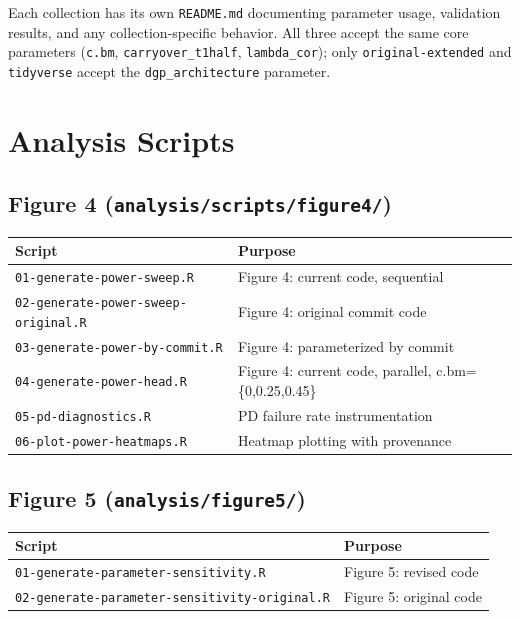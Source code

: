 \documentclass[11pt]{article}
\begin{document}
Each collection has its own \texttt{README.md} documenting
parameter usage, validation results, and any
collection-specific behavior. All three accept the same core
parameters (\texttt{c.bm}, \texttt{carryover\_t1half},
\texttt{lambda\_cor}); only \texttt{original-extended} and
\texttt{tidyverse} accept the \texttt{dgp\_architecture}
parameter.

\section{Analysis Scripts}

\subsection{Figure 4 (\texttt{analysis/scripts/figure4/})}

\begin{table}[h]
\centering
\begin{tabular}{ll}
\toprule
Script & Purpose \\
\midrule
\texttt{01-generate-power-sweep.R} & Figure 4: current code, sequential \\
\texttt{02-generate-power-sweep-original.R} & Figure 4: original commit code \\
\texttt{03-generate-power-by-commit.R} & Figure 4: parameterized by commit \\
\texttt{04-generate-power-head.R} & Figure 4: current code, parallel, c.bm=\{0,0.25,0.45\} \\
\texttt{05-pd-diagnostics.R} & PD failure rate instrumentation \\
\texttt{06-plot-power-heatmaps.R} & Heatmap plotting with provenance \\
\bottomrule
\end{tabular}
\end{table}

\subsection{Figure 5 (\texttt{analysis/figure5/})}

\begin{table}[h]
\centering
\begin{tabular}{ll}
\toprule
Script & Purpose \\
\midrule
\texttt{01-generate-parameter-sensitivity.R} & Figure 5: revised code \\
\texttt{02-generate-parameter-sensitivity-original.R} & Figure 5: original code \\
\bottomrule
\end{tabular}
\end{table}
\end{document}
